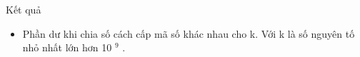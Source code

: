Kết quả
\begin{itemize}
	\item     Phần dư khi chia số cách cấp mã số khác nhau cho k. Với k là số nguyên tố nhỏ nhất lớn hơn 10    $^     9    $    .   
\end{itemize}